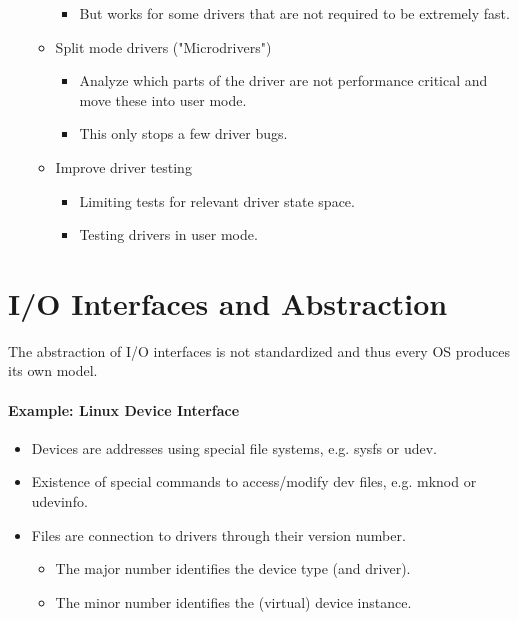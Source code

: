 \documentclass[a4paper, 11pt, accentcolor = tud3b]{tudreport}
\begin{document}
\begin{itemize}
\begin{itemize}
\begin{itemize}
		            			\item But works for some drivers that are not required to be extremely fast.
		            		\end{itemize}
	            		\item Split mode drivers ("Microdrivers")
		            		\begin{itemize}
		            			\item Analyze which parts of the driver are not performance critical and move these into user mode.
		            			\item This only stops a few driver bugs.
		            		\end{itemize}
	            		\item Improve driver testing
		            		\begin{itemize}
		            			\item Limiting tests for relevant driver state space.
		            			\item Testing drivers in user mode.
		            		\end{itemize}
	            	\end{itemize}
            \end{itemize}

        \section{I/O Interfaces and Abstraction}
            The abstraction of I/O interfaces is not standardized and thus every OS produces its own model.

			\paragraph{Example: Linux Device Interface}
				\begin{itemize}
					\item Devices are addresses using special file systems, e.g. sysfs or udev.
					\item Existence of special commands to access/modify dev files, e.g. mknod or udevinfo.
					\item Files are connection to drivers through their version number.
						\begin{itemize}
							\item The major number identifies the device type (and driver).
							\item The minor number identifies the (virtual) device instance.
						\end{itemize}
				\end{itemize}
\end{document}
